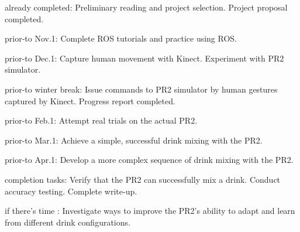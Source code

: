 \documentclass{sig-alternate}
\begin{document}
\begin{itemize*}
	\item {\sc already completed}: Preliminary reading and project selection. Project proposal completed.\vspace{3pt}
	\item {\sc prior-to Nov.1}: Complete ROS tutorials and practice using ROS.\vspace{3pt}
	\item {\sc prior-to Dec.1}: Capture human movement with Kinect. Experiment with PR2 simulator.\vspace{3pt}
	\item {\sc prior-to winter break}: Issue commands to PR2 simulator by human gestures captured by Kinect. Progress report completed.\vspace{3pt}
	\item {\sc prior-to Feb.1}: Attempt real trials on the actual PR2.\vspace{3pt}
	\item {\sc prior-to Mar.1}: Achieve a simple, successful drink mixing with the PR2.\vspace{3pt}
	\item {\sc prior-to Apr.1}: Develop a more complex sequence of drink mixing with the PR2.\vspace{3pt}
	\item {\sc completion tasks}: Verify that the PR2 can successfully mix a drink. Conduct accuracy testing. Complete write-up.\vspace{3pt}
	\item {\sc if there's time} : Investigate ways to improve the PR2's ability to adapt and learn from different drink configurations.
\end{itemize*}

\end{document}
